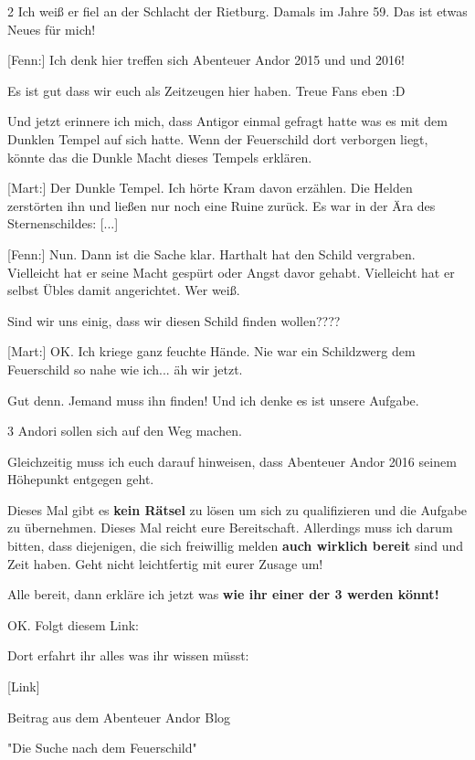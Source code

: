\documentclass[10pt, a4paper, oneside]{book}
\begin{document}
\begin{multicols}{2}
Ich weiß er fiel an der Schlacht der Rietburg. Damals im Jahre 59. Das ist etwas Neues für mich!

[Fenn:] Ich denk hier treffen sich Abenteuer Andor 2015 und und 2016!

Es ist gut dass wir euch als Zeitzeugen hier haben. Treue Fans eben :D

Und jetzt erinnere ich mich, dass Antigor einmal gefragt hatte was es mit dem Dunklen Tempel auf sich hatte. Wenn der Feuerschild dort verborgen liegt, könnte das die Dunkle Macht dieses Tempels erklären.

[Mart:] Der Dunkle Tempel. Ich hörte Kram davon erzählen. Die Helden zerstörten ihn und ließen nur noch eine Ruine zurück. Es war in der Ära des Sternenschildes: [...]

[Fenn:] Nun. Dann ist die Sache klar. Harthalt hat den Schild vergraben. Vielleicht hat er seine Macht gespürt oder Angst davor gehabt. Vielleicht hat er selbst Übles damit angerichtet. Wer weiß.

Sind wir uns einig, dass wir diesen Schild finden wollen????

[Mart:] OK. Ich kriege ganz feuchte Hände. Nie war ein Schildzwerg dem Feuerschild so nahe wie ich... äh wir jetzt.

Gut denn. Jemand muss ihn finden! Und ich denke es ist unsere Aufgabe.

3 Andori sollen sich auf den Weg machen.

Gleichzeitig muss ich euch darauf hinweisen, dass Abenteuer Andor 2016 seinem Höhepunkt entgegen geht.

Dieses Mal gibt es \textbf{kein Rätsel} zu lösen um sich zu qualifizieren und die Aufgabe zu übernehmen. Dieses Mal reicht eure Bereitschaft. Allerdings muss ich darum bitten, dass diejenigen, die sich freiwillig melden \textbf{auch wirklich bereit} sind und Zeit haben. Geht nicht leichtfertig mit eurer Zusage um!

Alle bereit, dann erkläre ich jetzt was \textbf{wie ihr einer der 3 werden könnt!}

OK. Folgt diesem Link:

Dort erfahrt ihr alles was ihr wissen müsst:

[Link]





\begin{center}
    Beitrag aus dem Abenteuer Andor Blog

    "Die Suche nach dem Feuerschild"


\end{center}
\end{multicols}
\end{document}
